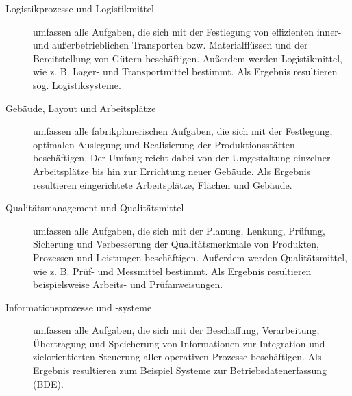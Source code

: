 \begin{description}
 \item[Logistikprozesse und Logistikmittel]
umfassen alle Aufgaben, die sich mit
der Festlegung von effizienten inner-
und außerbetrieblichen Transporten
bzw. Materialflüssen und der Bereitstellung von Gütern beschäftigen.
Außerdem werden Logistikmittel, wie
z. B. Lager- und Transportmittel bestimmt. Als Ergebnis resultieren sog.
Logistiksysteme.

 \item[Gebäude, Layout und Arbeitsplätze]
umfassen alle fabrikplanerischen Aufgaben, die sich mit der Festlegung, optimalen Auslegung und Realisierung
der Produktionsstätten beschäftigen.
Der Umfang reicht dabei von der Umgestaltung einzelner Arbeitsplätze bis
hin zur Errichtung neuer Gebäude.
Als Ergebnis resultieren eingerichtete
Arbeitsplätze, Flächen und Gebäude.


 \item[Qualitätsmanagement und Qualitätsmittel] umfassen alle Aufgaben, die
sich mit der Planung, Lenkung, Prüfung, Sicherung und Verbesserung
der Qualitätsmerkmale von Produkten, Prozessen und Leistungen beschäftigen. Außerdem werden Qualitätsmittel, wie z. B. Prüf- und Messmittel bestimmt. Als Ergebnis resultieren beispielsweise Arbeits- und
Prüfanweisungen.

\item[Informationsprozesse und -systeme]
umfassen alle Aufgaben, die sich mit
der Beschaffung, Verarbeitung, Übertragung und Speicherung von Informationen zur Integration und zielorientierten Steuerung aller operativen Prozesse beschäftigen. Als Ergebnis resultieren zum Beispiel Systeme
zur Betriebsdatenerfassung (BDE).
\end{description}

